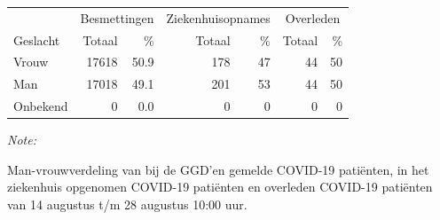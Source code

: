 \documentclass[
  english,
  man,floatsintext]{apa6}
\begin{document}
\begin{table}
\centering\begingroup\fontsize{11}{13}\selectfont

\begin{threeparttable}
\begin{tabular}{lrrrrrr}
\toprule
\multicolumn{1}{c}{ } & \multicolumn{2}{c}{Besmettingen} & \multicolumn{2}{c}{Ziekenhuisopnames} & \multicolumn{2}{c}{Overleden} \\
\cmidrule(l{3pt}r{3pt}){2-3} \cmidrule(l{3pt}r{3pt}){4-5} \cmidrule(l{3pt}r{3pt}){6-7}
Geslacht & Totaal & \% & Totaal & \% & Totaal & \%\\
\midrule
Vrouw & 17618 & 50.9 & 178 & 47 & 44 & 50\\
Man & 17018 & 49.1 & 201 & 53 & 44 & 50\\
Onbekend & 0 & 0.0 & 0 & 0 & 0 & 0\\
\bottomrule
\end{tabular}
\begin{tablenotes}
\item \textit{Note: } 
\item Man-vrouwverdeling van bij de GGD’en gemelde COVID-19 patiënten, in het ziekenhuis opgenomen COVID-19 patiënten en overleden COVID-19 patiënten van 14 augustus t/m 28 augustus 10:00 uur.
\end{tablenotes}
\end{threeparttable}
\endgroup{}
\end{table}
\newpage
\end{document}
